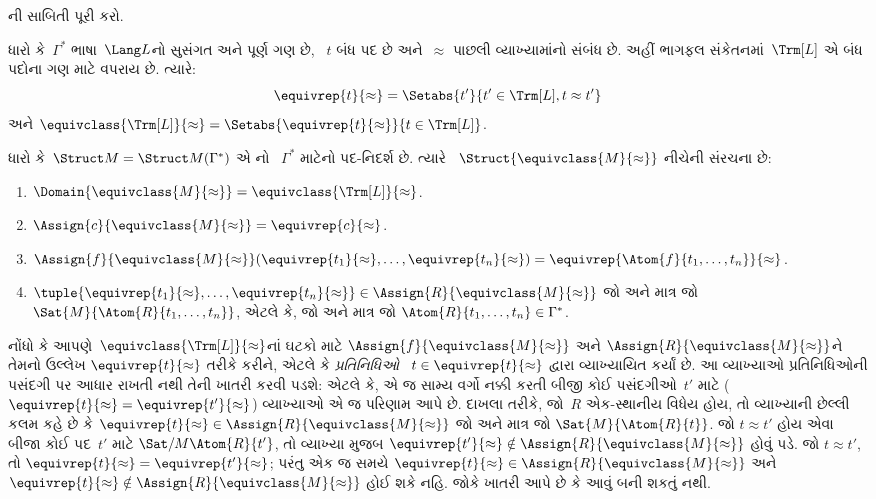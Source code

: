 
\begin{prob}
ની સાબિતી પૂરી કરો.
\end{prob}

\begin{defn}
ધારો કે~$\Gamma^*$ ભાષા~$\Lang L$નો સુસંગત અને પૂર્ણ ગણ છે,
~$t$ બંધ પદ છે અને~$\approx$ પાછલી વ્યાખ્યામાંનો સંબંધ છે.
અહીં ભાગફલ સંકેતનમાં~$\Trm[L]$ એ બંધ પદોના ગણ માટે વપરાય છે. ત્યારે:
\[
\equivrep{t}{\approx}=\Setabs{t'}{t'\in\Trm[L],t\approx t'}
\]
અને
$\equivclass{\Trm[L]}{\approx}=\Setabs{\equivrep{t}{\approx}}{t\in\Trm[L]}$.
\end{defn}

\begin{defn}
ધારો કે~$\Struct M=\Struct M(\Gamma^*)$ એ નો
~$\Gamma^*$ માટેનો પદ-નિદર્શ છે. ત્યારે
~$\Struct{\equivclass{M}{\approx}}$ નીચેની સંરચના છે:
\begin{enumerate}
\item $\Domain{\equivclass{M}{\approx}}=\equivclass{\Trm[L]}{\approx}$.
\item $\Assign{c}{\equivclass{M}{\approx}}=\equivrep{c}{\approx}$.
\item $\Assign{f}{\equivclass{M}{\approx}}(\equivrep{t_1}{\approx},\dots,
  \equivrep{t_n}{\approx})=\equivrep{\Atom{f}{t_1,\dots,t_n}}{\approx}$.
\item $\tuple{\equivrep{t_1}{\approx},\dots,\equivrep{t_n}{\approx}}
  \in\Assign{R}{\equivclass{M}{\approx}}$ જો અને માત્ર જો
  $\Sat{M}{\Atom{R}{t_1,\dots,t_n}}$, એટલે કે, જો અને માત્ર જો
  $\Atom{R}{t_1,\dots,t_n}\in\Gamma^*$.
\end{enumerate}
\end{defn}

\begin{explain}
નોંધો કે આપણે~$\equivclass{\Trm[L]}{\approx}$નાં ઘટકો માટે
$\Assign{f}{\equivclass{M}{\approx}}$ અને
$\Assign{R}{\equivclass{M}{\approx}}$ને તેમનો ઉલ્લેખ
$\equivrep{t}{\approx}$ તરીકે કરીને, એટલે કે \emph{પ્રતિનિધિઓ}
~$t\in\equivrep{t}{\approx}$ દ્વારા વ્યાખ્યાયિત કર્યાં છે. આ વ્યાખ્યાઓ
પ્રતિનિધિઓની પસંદગી પર આધાર રાખતી નથી તેની ખાતરી કરવી પડશે: એટલે કે,
એ જ સામ્ય વર્ગો નક્કી કરતી બીજી કોઈ પસંદગીઓ~$t'$ માટે
($\equivrep{t}{\approx}=\equivrep{t'}{\approx}$) વ્યાખ્યાઓ એ જ પરિણામ
આપે છે. દાખલા તરીકે, જો~$R$ એક-સ્થાનીય વિધેય હોય, તો
વ્યાખ્યાની છેલ્લી કલમ કહે છે કે $\equivrep{t}{\approx}\in
\Assign{R}{\equivclass{M}{\approx}}$ જો અને માત્ર જો
$\Sat{M}{\Atom{R}{t}}$. જો $t\approx t'$ હોય એવા બીજા કોઈ પદ~$t'$ માટે
$\Sat/{M}{\Atom{R}{t'}}$, તો વ્યાખ્યા મુજબ
$\equivrep{t'}{\approx}\notin\Assign{R}{\equivclass{M}{\approx}}$ હોવું
પડે. જો $t\approx t'$, તો $\equivrep{t}{\approx}=
\equivrep{t'}{\approx}$; પરંતુ એક જ સમયે $\equivrep{t}{\approx}\in
\Assign{R}{\equivclass{M}{\approx}}$ અને $\equivrep{t}{\approx}\notin
\Assign{R}{\equivclass{M}{\approx}}$ હોઈ શકે નહિ. જોકે
 ખાતરી આપે છે કે આવું બની શકતું નથી.
\end{explain}

